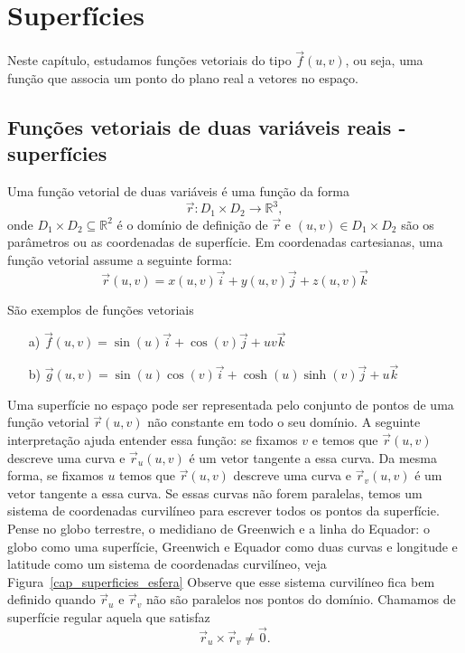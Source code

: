 \chapter{Superfícies}
Neste capítulo, estudamos funções vetoriais do tipo $\vec{f}(u,v)$, ou seja, uma função que associa um ponto do plano real a vetores no espaço.
\section{Funções vetoriais de duas variáveis reais - superfícies}
Uma função vetorial de duas variáveis é uma função da forma $$\vec{r}:D_1\times D_2 \to \mathbb{R}^3,$$ onde $D_1\times D_2\subseteq \mathbb{R}^2$ é o domínio de definição de $\vec{r}$ e $(u,v)\in D_1\times D_2$ são os parâmetros ou as coordenadas de superfície. Em coordenadas cartesianas, uma função vetorial assume a seguinte forma:
$$\vec{r}(u,v)=x(u,v)\vec{i}+y(u,v)\vec{j}+z(u,v)\vec{k}$$
\begin{ex}\label{exfv_1} São exemplos de funções vetoriais
\begin{itemize}
\item [a)] $\vec{f}(u,v)=\sin(u)\vec{i}+\cos(v)\vec{j}+uv\vec{k}$
\item [b)] $\vec{g}(u,v)=\sin(u)\cos(v) \vec{i}+\cosh(u)\sinh(v)\vec{j}+u\vec{k}$
\end{itemize}
\end{ex}
Uma superfície no espaço pode ser representada pelo conjunto de pontos de uma função vetorial $\vec{r}(u,v)$ não constante em todo o seu domínio. A seguinte interpretação ajuda entender essa função: se fixamos $v$ e temos que $\vec{r}(u,v)$ descreve uma curva e $\vec{r}_u(u,v)$ é um vetor tangente a essa curva. Da mesma forma, se fixamos $u$ temos que $\vec{r}(u,v)$ descreve uma curva e $\vec{r}_v(u,v)$ é um vetor tangente a essa curva. Se essas curvas não forem paralelas, temos um sistema de coordenadas curvilíneo para escrever todos os pontos da superfície. Pense no globo terrestre, o medidiano de Greenwich e a linha do Equador: o globo como uma superfície, Greenwich e Equador como duas curvas e longitude e latitude como um sistema de coordenadas curvilíneo, veja Figura~\ref{cap_superficies_esfera} Observe que esse sistema curvilíneo fica bem definido quando $\vec{r}_u$ e $\vec{r}_v$ não são paralelos nos pontos do domínio. Chamamos de superfície regular aquela que satisfaz
$$
\vec{r}_u\times \vec{r}_v\neq \vec{0}.
$$
